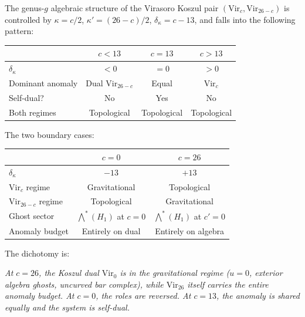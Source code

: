 \begin{theorem}
The genus-$g$ algebraic structure of the Virasoro Koszul pair
$(\mathrm{Vir}_c, \mathrm{Vir}_{26-c})$ is controlled by
$\kappa = c/2$, $\kappa' = (26-c)/2$,
$\delta_\kappa = c - 13$, and falls into the following
pattern:

\begin{center}
\renewcommand{\arraystretch}{1.4}
\begin{tabular}{lccc}
\toprule
& $c < 13$ & $c = 13$ & $c > 13$ \\
\midrule
$\delta_\kappa$ & $< 0$ & $= 0$ & $> 0$ \\
Dominant anomaly & Dual $\mathrm{Vir}_{26-c}$ &
Equal & $\mathrm{Vir}_c$ \\
Self-dual? & No & Yes & No \\
Both regimes & Topological & Topological & Topological \\
\bottomrule
\end{tabular}
\end{center}

\smallskip\noindent
The two boundary cases:
\begin{center}
\renewcommand{\arraystretch}{1.4}
\begin{tabular}{lcc}
\toprule
& $c = 0$ & $c = 26$ \\
\midrule
$\delta_\kappa$ & $-13$ & $+13$ \\
$\mathrm{Vir}_c$ regime & Gravitational & Topological \\
$\mathrm{Vir}_{26-c}$ regime & Topological & Gravitational \\
Ghost sector & $\bigwedge^*(H_1)$ at $c=0$ &
$\bigwedge^*(H_1)$ at $c'=0$ \\
Anomaly budget & Entirely on dual & Entirely on algebra \\
\bottomrule
\end{tabular}
\end{center}

\smallskip\noindent
The dichotomy is:

\emph{At $c = 26$, the Koszul dual $\mathrm{Vir}_0$ is in the
gravitational regime \textup{(}$u = 0$, exterior algebra ghosts,
uncurved bar complex\textup{)}, while $\mathrm{Vir}_{26}$ itself
carries the entire anomaly budget. At $c = 0$, the roles are
reversed. At $c = 13$, the anomaly is shared equally and the system
is self-dual.}
\end{theorem}

